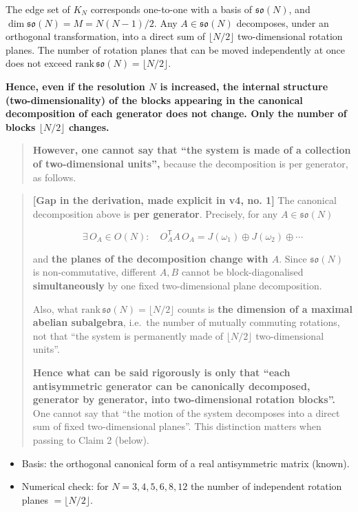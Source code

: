 \documentclass[
  10pt,
]{article}
\providecommand{\tightlist}{%
  \setlength{\itemsep}{0pt}\setlength{\parskip}{0pt}}
\begin{document}
The edge set of \(K_N\) corresponds one-to-one with a basis of
\(\mathfrak{so}(N)\), and \(\dim\mathfrak{so}(N) = M = N(N-1)/2\). Any
\(A \in \mathfrak{so}(N)\) decomposes, under an orthogonal
transformation, into a direct sum of \(\lfloor N/2\rfloor\)
two-dimensional rotation planes. The number of rotation planes that can
be moved independently at once does not exceed
\(\mathrm{rank}\,\mathfrak{so}(N) = \lfloor N/2\rfloor\).

\textbf{Hence, even if the resolution \(N\) is increased, the internal
structure (two-dimensionality) of the blocks appearing in the canonical
decomposition of each generator does not change. Only the number of
blocks \(\lfloor N/2\rfloor\) changes.}

\begin{quote}
\textbf{However, one cannot say that ``the system is made of a
collection of two-dimensional units'',} because the decomposition is per
generator, as follows.
\end{quote}

\begin{quote}
\textbf{{[}Gap in the derivation, made explicit in v4, no. 1{]}} The
canonical decomposition above is \textbf{per generator}. Precisely, for
any \(A \in \mathfrak{so}(N)\)

\[\exists\, O_A \in O(N): \quad O_A^{\mathsf T} A\, O_A = J(\omega_1)\oplus J(\omega_2)\oplus\cdots\]

and \textbf{the planes of the decomposition change with \(A\)}. Since
\(\mathfrak{so}(N)\) is non-commutative, different \(A, B\) cannot be
block-diagonalised \textbf{simultaneously} by one fixed two-dimensional
plane decomposition.

Also, what \(\mathrm{rank}\,\mathfrak{so}(N) = \lfloor N/2\rfloor\)
counts is \textbf{the dimension of a maximal abelian subalgebra},
i.e.~the number of mutually commuting rotations, not that ``the system
is permanently made of \(\lfloor N/2\rfloor\) two-dimensional units''.

\textbf{Hence what can be said rigorously is only that ``each
antisymmetric generator can be canonically decomposed, generator by
generator, into two-dimensional rotation blocks''.} One cannot say that
``the motion of the system decomposes into a direct sum of fixed
two-dimensional planes''. This distinction matters when passing to Claim
2 (below).
\end{quote}

\begin{itemize}
\tightlist
\item
  Basis: the orthogonal canonical form of a real antisymmetric matrix
  (known).
\item
  Numerical check: for \(N=3,4,5,6,8,12\) the number of independent
  rotation planes \(=\lfloor N/2\rfloor\).
\end{itemize}
\end{document}

